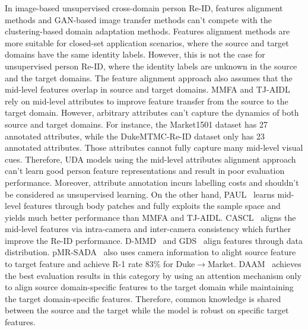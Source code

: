 \documentclass[a4paper,fleqn]{cas-dc}
\begin{document}
In image-based unsupervised cross-domain person Re-ID, features alignment methods and GAN-based image transfer methods can't compete with the clustering-based domain adaptation methods. Features alignment methods are more suitable for closed-set application scenarios, where the source and target domains have the same identity labels. However, this is not the case for unsupervised person Re-ID, where the identity labels are unknown in the source and the target domains. The feature alignment approach also assumes that the mid-level features overlap in source and target domains. MMFA and TJ-AIDL rely on mid-level attributes to improve feature transfer from the source to the target domain. However, arbitrary attributes can't capture the dynamics of both source and target domains. For instance, the Market1501 dataset has 27 annotated attributes, while the DukeMTMC-Re-ID dataset only has 23 annotated attributes. Those attributes cannot fully capture many mid-level visual cues. Therefore, UDA models using the mid-level attributes alignment approach can't learn good person feature representations and result in poor evaluation performance. Moreover, attribute annotation incurs labelling costs and shouldn't be considered as unsupervised learning. On the other hand, PAUL~\cite{yang_patch-based_2019} learns mid-level features through body patches and fully exploits the sample space and yields much better performance than MMFA and TJ-AIDL. CASCL~\cite{wu_unsupervised_2019} aligns the mid-level features via intra-camera and inter-camera consistency which further improve the Re-ID performance. D-MMD~\cite{vedaldi_unsupervised_2020-1} and GDS~\cite{vedaldi_global_2020} align features through data distribution. 
pMR-SADA~\cite{wang_smoothing_2020} also uses camera information to alight source feature to target feature and achieve R-1 rate 83\% for Duke$\rightarrow$Market. DAAM~\cite{huang_domain_2020} achieves the best evaluation results in this category by using an attention mechanism only to align source domain-specific features to the target domain while maintaining the target domain-specific features. Therefore, common knowledge is shared between the source and the target while the model is robust on specific target features.
\end{document}
